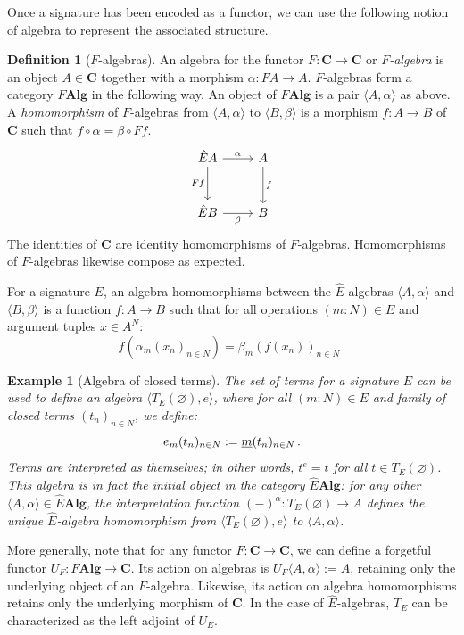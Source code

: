 \documentclass[11pt,oneside]{book}
\newtheorem{example}[theorem]{Example}
\theoremstyle{definition}
\newtheorem{definition}[theorem]{Definition}
\newcommand{\ul}[1]{%
  \underline{\smash{#1}}
}
\begin{document}
Once a signature has been encoded as a functor,
we can use the following notion of algebra
to represent the associated structure.

\begin{definition}[$F$-algebras]
An algebra for the functor
$F : \mathbf{C} \rightarrow \mathbf{C}$
or \emph{$F$-algebra}
is an object $A \in \mathbf{C}$
together with a morphism $\alpha : F A \rightarrow A$.
$F$-algebras form a category $F \mathbf{Alg}$
in the following way.
An object of $F \mathbf{Alg}$
is a pair $\langle A, \alpha \rangle$ as above.
A \emph{homomorphism} of $F$-algebras
from $\langle A, \alpha \rangle$ to $\langle B, \beta \rangle$
is a morphism $f : A \rightarrow B$ of $\mathbf{C}$
such that $f \circ \alpha = \beta \circ F f$.
\[
  \begin{tikzcd}[row sep=large]
    \hat{E} A \ar[r, "\alpha"] \ar[d, "F f"'] & A \ar[d, "f"] \\
    \hat{E} B \ar[r, "\beta"']                & B
  \end{tikzcd}
\]
The identities of $\mathbf{C}$
are identity homomorphisms of $F$-algebras.
Homomorphisms of $F$-algebras likewise compose as expected.
\end{definition}

For a signature $E$,
an algebra homomorphisms
between the $\hat{E}$-algebras
$\langle A, \alpha \rangle$ and
$\langle B, \beta \rangle$
is a function $f : A \rightarrow B$ such that
for all operations $(m \mathbin{:} N) \in E$
and argument tuples $x \in A^N$:
\[
  f(\alpha_m(x_n)_{n \in N}) = \beta_m(f(x_n))_{n \in N} \,.
\]

\begin{example}[Algebra of closed terms]
The set of terms for a signature $E$
can be used to define an algebra
$\langle T_E(\varnothing), e \rangle$,
where for all $(m \mathbin{:} N) \in E$ and
family of closed terms $(t_n)_{n \in N}$,
we define:
\[
  e_m(t_n)_{n \in N} := \ul{m}(t_n)_{n \in N}
  \,.
\]
Terms are interpreted as themselves;
in other words, $t^e = t$ for all $t \in T_E(\varnothing)$.
This algebra is in fact the \emph{initial object}
in the category $\hat{E} \mathbf{Alg}$:
for any other
$\langle A, \alpha \rangle \in \hat{E} \mathbf{Alg}$,
the interpretation function
$(-)^\alpha : T_E(\varnothing) \rightarrow A$
defines the unique $\hat{E}$-algebra homomorphism
from $\langle T_E(\varnothing), e \rangle$ to
$\langle A, \alpha \rangle$.
\end{example}

More generally,
note that for any functor $F : \mathbf{C} \rightarrow \mathbf{C}$,
we can define a forgetful functor
$U_F : F \mathbf{Alg} \rightarrow \mathbf{C}$.
Its action on algebras is
$U_F \langle A, \alpha \rangle := A$,
retaining only the underlying object of an $F$-algebra.
Likewise,
its action on algebra homomorphisms
retains only the underlying morphism of $\mathbf{C}$.
In the case of $\hat{E}$-algebras,
$T_E$ can be characterized as the left adjoint of $U_E$.
\end{document}
